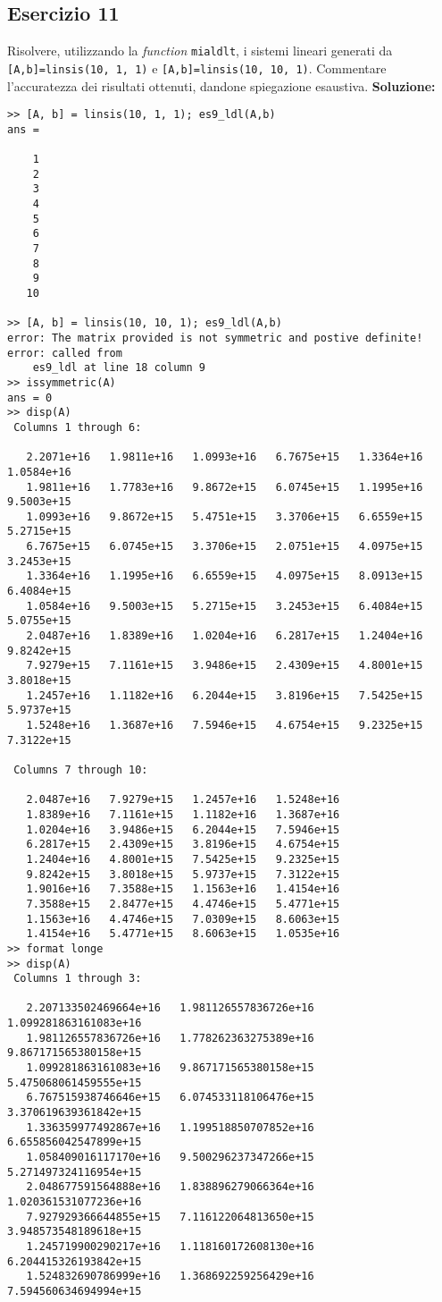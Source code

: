 \subsection{Esercizio 11}
Risolvere, utilizzando la \textit{function} \lstinline{mialdlt}, i sistemi
lineari generati da \lstinline{[A,b]=linsis(10, 1, 1)} e \lstinline{[A,b]=linsis(10, 10, 1)}.
Commentare l'accuratezza dei risultati ottenuti, dandone spiegazione esaustiva.
\newline \textbf{Soluzione:}

\begin{lstlisting}
>> [A, b] = linsis(10, 1, 1); es9_ldl(A,b)
ans =

    1
    2
    3
    4
    5
    6
    7
    8
    9
   10

>> [A, b] = linsis(10, 10, 1); es9_ldl(A,b)
error: The matrix provided is not symmetric and postive definite!
error: called from
    es9_ldl at line 18 column 9
>> issymmetric(A)
ans = 0
>> disp(A)
 Columns 1 through 6:

   2.2071e+16   1.9811e+16   1.0993e+16   6.7675e+15   1.3364e+16   1.0584e+16
   1.9811e+16   1.7783e+16   9.8672e+15   6.0745e+15   1.1995e+16   9.5003e+15
   1.0993e+16   9.8672e+15   5.4751e+15   3.3706e+15   6.6559e+15   5.2715e+15
   6.7675e+15   6.0745e+15   3.3706e+15   2.0751e+15   4.0975e+15   3.2453e+15
   1.3364e+16   1.1995e+16   6.6559e+15   4.0975e+15   8.0913e+15   6.4084e+15
   1.0584e+16   9.5003e+15   5.2715e+15   3.2453e+15   6.4084e+15   5.0755e+15
   2.0487e+16   1.8389e+16   1.0204e+16   6.2817e+15   1.2404e+16   9.8242e+15
   7.9279e+15   7.1161e+15   3.9486e+15   2.4309e+15   4.8001e+15   3.8018e+15
   1.2457e+16   1.1182e+16   6.2044e+15   3.8196e+15   7.5425e+15   5.9737e+15
   1.5248e+16   1.3687e+16   7.5946e+15   4.6754e+15   9.2325e+15   7.3122e+15

 Columns 7 through 10:

   2.0487e+16   7.9279e+15   1.2457e+16   1.5248e+16
   1.8389e+16   7.1161e+15   1.1182e+16   1.3687e+16
   1.0204e+16   3.9486e+15   6.2044e+15   7.5946e+15
   6.2817e+15   2.4309e+15   3.8196e+15   4.6754e+15
   1.2404e+16   4.8001e+15   7.5425e+15   9.2325e+15
   9.8242e+15   3.8018e+15   5.9737e+15   7.3122e+15
   1.9016e+16   7.3588e+15   1.1563e+16   1.4154e+16
   7.3588e+15   2.8477e+15   4.4746e+15   5.4771e+15
   1.1563e+16   4.4746e+15   7.0309e+15   8.6063e+15
   1.4154e+16   5.4771e+15   8.6063e+15   1.0535e+16
>> format longe
>> disp(A)
 Columns 1 through 3:

   2.207133502469664e+16   1.981126557836726e+16   1.099281863161083e+16
   1.981126557836726e+16   1.778262363275389e+16   9.867171565380158e+15
   1.099281863161083e+16   9.867171565380158e+15   5.475068061459555e+15
   6.767515938746646e+15   6.074533118106476e+15   3.370619639361842e+15
   1.336359977492867e+16   1.199518850707852e+16   6.655856042547899e+15
   1.058409016117170e+16   9.500296237347266e+15   5.271497324116954e+15
   2.048677591564888e+16   1.838896279066364e+16   1.020361531077236e+16
   7.927929366644855e+15   7.116122064813650e+15   3.948573548189618e+15
   1.245719900290217e+16   1.118160172608130e+16   6.204415326193842e+15
   1.524832690786999e+16   1.368692259256429e+16   7.594560634694994e+15


\end{lstlisting}
